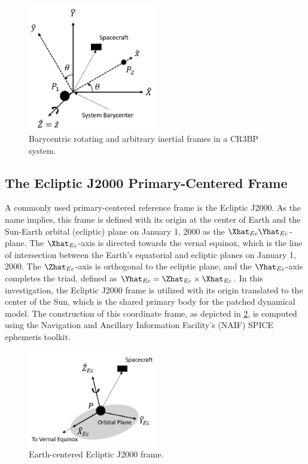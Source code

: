 \begin{figure}[H]
    \centering
    \includegraphics[width=0.5\textwidth]{figures/BaryFrames.jpg}
    \caption{Barycentric rotating and arbitrary inertial frames in a CR3BP system.}
    \label{fig:baryFrames}
\end{figure}

\subsection{The Ecliptic J2000 Primary-Centered Frame}
A commonly used primary-centered reference frame is the Ecliptic J2000. As the name implies, this
frame is defined with its origin at the center of Earth and the Sun-Earth orbital (ecliptic) plane
on January 1, 2000 as the $\Xhat_{Ec}\Yhat_{Ec}$-plane. The $\Xhat_{Ec}$-axis is directed towards
the vernal equinox, which is the line of intersection between the Earth's equatorial and ecliptic
planes on January 1, 2000. The $\Zhat_{Ec}$-axis is orthogonal to the ecliptic plane, and the
$\Yhat_{Ec}$-axis completes the triad, defined as $\Yhat_{Ec}=\Zhat_{Ec}\times\Xhat_{Ec}$. In this
investigation, the Ecliptic J2000 frame is utilized with its origin translated to the center of the
Sun, which is the shared primary body for the patched dynamical model. The construction of this
coordinate frame, as depicted in \cref{fig:eclipJ2000Frame}, is computed using the Navigation and
Ancillary Information Facility's (NAIF) SPICE ephemeris toolkit\cite{Semenov:2023}.

\begin{figure}[H]
    \centering
    \includegraphics[width=0.5\textwidth]{figures/EclipJ2000Frame.jpg}
    \caption{Earth-centered Ecliptic J2000 frame.}
    \label{fig:eclipJ2000Frame}
\end{figure}
